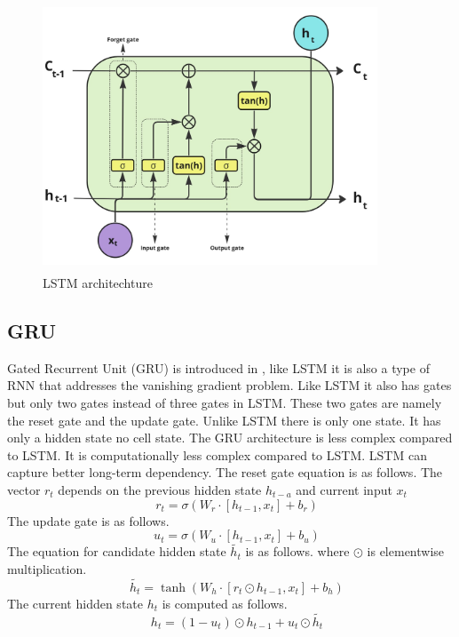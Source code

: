 \documentclass{ws-ijait}
\begin{document}
\begin{center}
	\begin{figure}[!htbp]
		\centering
		\includegraphics[width=10cm, height=8cm]{LSTM.jpg}
		\caption{LSTM architechture}
		\label{lstm}
	\end{figure}
\end{center}


\subsection{GRU}
\par Gated Recurrent Unit (GRU) is introduced in \cite{cho2014learning}, like LSTM it is also a type of RNN that addresses the vanishing gradient problem. Like LSTM it also has gates but only two gates instead of three gates in LSTM. These two gates are namely the reset gate and the update gate. Unlike LSTM there is only one state. It has only a hidden state no cell state. The GRU architecture is less complex compared to LSTM. It is computationally less complex compared to LSTM. LSTM can capture better long-term dependency. The reset gate equation is as follows. The vector $r_t$ depends on the previous hidden state $h_{t-a}$ and current input $x_t$
\begin{equation}
	\quad r_t = \sigma(W_{r} \cdot [h_{t-1},x_t] + b_{r})
\end{equation}
The update gate is as follows. 
\begin{equation}
	\quad u_t = \sigma(W_{u} \cdot [h_{t-1},x_t] + b_{u})
\end{equation} 
The equation for candidate hidden state $\tilde{h_t}$ is as follows. where $\odot$ is elementwise multiplication.  
\begin{equation}
	\quad \tilde{h_t}= \tanh(W_{h} \cdot [r_t\odot h_{t-1},x_t] + b_{h})
\end{equation}
The current hidden state ${h_t}$ is computed as follows.
\begin{equation}
	\quad {h_t}= (1-u_t) \odot h_{t-1} + u_t \odot \tilde{h_t}
\end{equation}
\end{document}
